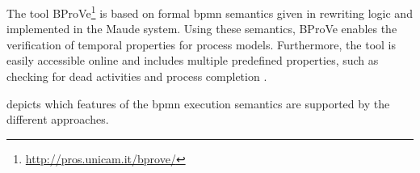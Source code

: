 \documentclass[adraft, copyright, creativecommons]{eptcs} %
\begin{document}
The tool BProVe\footnote{\url{http://pros.unicam.it/bprove/}} is based on formal \gls*{bpmn} semantics given in rewriting logic and implemented in the Maude system.
Using these semantics, BProVe enables the verification of temporal properties for process models.
Furthermore, the tool is easily accessible online and includes multiple predefined properties, such as checking for dead activities and process completion \cite{corradiniFormalApproachAnalysis2021}.


 depicts which features of the \gls*{bpmn} execution semantics are supported by the different approaches.

\begin{table}[htbp]


\end{table}
\end{document}
